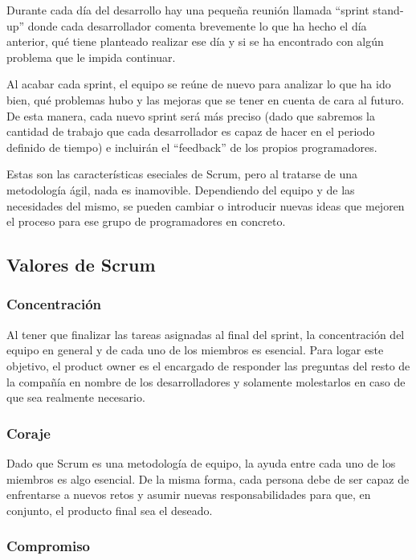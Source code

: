 Durante cada día del desarrollo hay una pequeña reunión llamada ``sprint stand-up'' donde cada desarrollador comenta brevemente lo que ha hecho el día anterior, qué tiene planteado realizar ese día y si se ha encontrado con algún problema que le impida continuar.

Al acabar cada sprint, el equipo se reúne de nuevo para analizar lo que ha ido bien, qué problemas hubo y las mejoras que se tener en cuenta de cara al futuro. De esta manera, cada nuevo sprint será más preciso (dado que sabremos la cantidad de trabajo que cada desarrollador es capaz de hacer en el periodo definido de tiempo) e incluirán el ``feedback'' de los propios programadores.

Estas son las características eseciales de Scrum, pero al tratarse de una metodología ágil, nada es inamovible. Dependiendo del equipo y de las necesidades del mismo, se pueden cambiar o introducir nuevas ideas que mejoren el proceso para ese grupo de programadores en concreto.

\subsection{Valores de Scrum}

\subsubsection{Concentración}

Al tener que finalizar las tareas asignadas al final del sprint, la concentración del equipo en general y de cada uno de los miembros es esencial. Para logar este objetivo, el product owner es el encargado de responder las preguntas del resto de la compañía en nombre de los desarrolladores y solamente molestarlos en caso de que sea realmente necesario. 

\subsubsection{Coraje}

Dado que Scrum es una metodología de equipo, la ayuda entre cada uno de los miembros es algo esencial. De la misma forma, cada persona debe de ser capaz de enfrentarse a nuevos retos y asumir nuevas responsabilidades para que, en conjunto, el producto final sea el deseado. 

\subsubsection{Compromiso}

